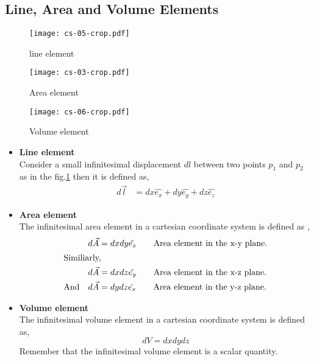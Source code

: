 \subsection{Line, Area and Volume Elements}
\begin{figure}[h]
	\begin{minipage}{0.30\textwidth}
		\texttt{[image: cs-05-crop.pdf]}
		\caption{line element}
		\label{line element}
	\end{minipage}
	\begin{minipage}{0.35\textwidth}
		\texttt{[image: cs-03-crop.pdf]}
		\caption{Area element}
	\end{minipage}
	\begin{minipage}{0.30\textwidth}
		\texttt{[image: cs-06-crop.pdf]}
		\caption{Volume element}
	\end{minipage}
\end{figure}
\begin{itemize}
	\item{\textbf{Line element}}\\
	Consider a small infinitesimal displacement $dl$  between two points $p_{1}$ and $p_{2}$ as in the fig.\ref{line element} then it  is defined as, \begin{align*}
	d {\vec{l}}&=d x \hat{e_{x}}+d y \hat{e_{y}}+d z \hat{e_{z}}
	\end{align*}
	\item{\textbf{Area element}}\\ The infinitesimal area element in a cartesian coordinate system is defined as ,
	\begin{align*}
	d\vec{A}&=dx dy \hat{e_{z}}\qquad \text{Area element in the x-y plane.}\\
	\intertext{Similiarly, }\
	d\vec{A}&=dx dz \hat{e_{y}} \qquad \text{Area element in the x-z plane.}\\
	\text{And}\quad  d\vec{A}&=dy dz  \hat{e_{x}} \qquad \text{Area element in the y-z plane.}
	\end{align*}
	\item{\textbf{Volume element}}\\ The infinitesimal volume element in a cartesian coordinate system is defined as,
	\begin{equation*}
	d{V}=dx dy dz 
	\end{equation*}
	Remember that the infinitesimal volume element is a scalar quantity.	
	
	
\end{itemize}
